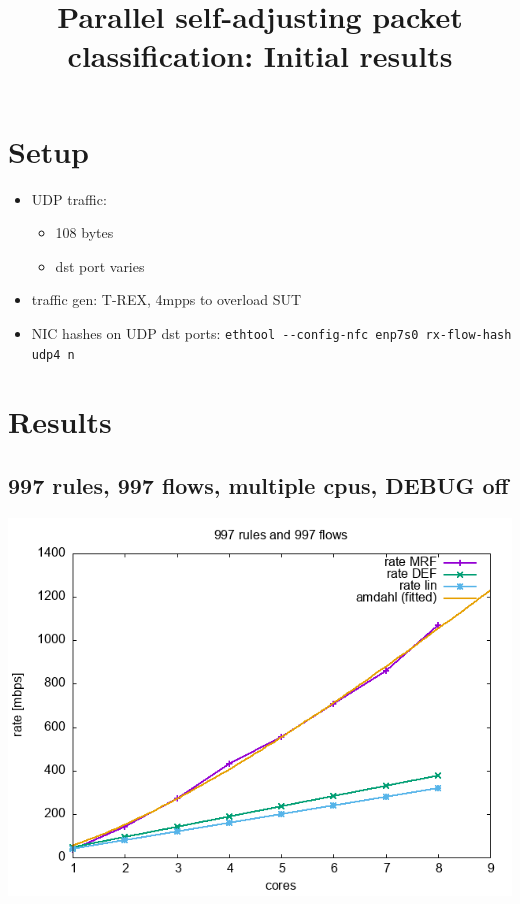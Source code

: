 \documentclass[11pt]{article}
\date{}
\title{Parallel self-adjusting packet classification: Initial results}
\begin{document}
\maketitle
{}
\frenchspacing

\section*{Setup}
\label{sec:org57d8c91}
\begin{itemize}
\item UDP traffic:
\begin{itemize}
\item 108 bytes
\item dst port varies
\end{itemize}
\item traffic gen: T-REX, 4mpps to overload SUT
\item NIC hashes on UDP dst ports: \texttt{ethtool -{}-{}config-nfc enp7s0 rx-flow-hash udp4 n}
\end{itemize}

\section*{Results}
\label{sec:orgf348cdb}

\subsection*{997 rules, 997 flows, multiple cpus, DEBUG off}
\label{sec:org619584f}
\begin{center}
\includegraphics[width=.9\linewidth]{plot-997rules-997flows.png}
\end{center}
\end{document}
